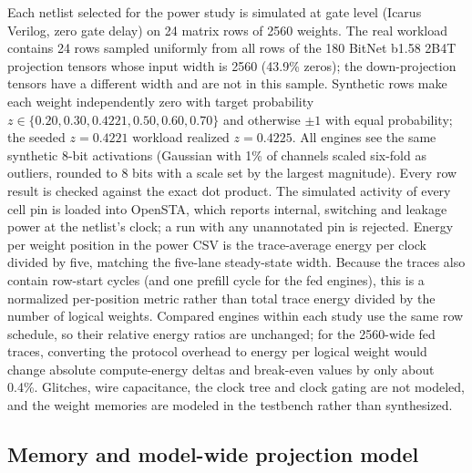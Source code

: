 \documentclass[11pt]{article}
\begin{document}
Each netlist selected for the power study is simulated at gate level (Icarus Verilog, zero gate delay) on 24 matrix rows of 2560 weights. The real workload contains 24 rows sampled uniformly from all rows of the 180 BitNet b1.58 2B4T projection tensors whose input width is 2560 (43.9\% zeros); the down-projection tensors have a different width and are not in this sample. Synthetic rows make each weight independently zero with target probability $z\in\{0.20,0.30,0.4221,0.50,0.60,0.70\}$ and otherwise $\pm1$ with equal probability; the seeded $z=0.4221$ workload realized $z=0.4225$. All engines see the same synthetic 8-bit activations (Gaussian with 1\% of channels scaled six-fold as outliers, rounded to 8 bits with a scale set by the largest magnitude). Every row result is checked against the exact dot product. The simulated activity of every cell pin is loaded into OpenSTA, which reports internal, switching and leakage power at the netlist's clock; a run with any unannotated pin is rejected. Energy per weight position in the power CSV is the trace-average energy per clock divided by five, matching the five-lane steady-state width. Because the traces also contain row-start cycles (and one prefill cycle for the fed engines), this is a normalized per-position metric rather than total trace energy divided by the number of logical weights. Compared engines within each study use the same row schedule, so their relative energy ratios are unchanged; for the 2560-wide fed traces, converting the protocol overhead to energy per logical weight would change absolute compute-energy deltas and break-even values by only about 0.4\%. Glitches, wire capacitance, the clock tree and clock gating are not modeled, and the weight memories are modeled in the testbench rather than synthesized.

\subsection{Memory and model-wide projection model}
\end{document}
